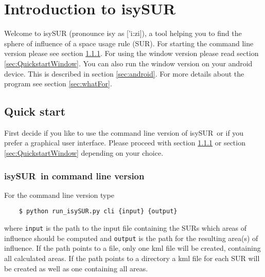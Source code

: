 \documentclass[11pt,fleqn]{book} %
\newcommand{\ProjectTitle}{isySUR}
\newcommand{\pt}{\ProjectTitle}
\begin{document}

\pagestyle{empty} %

\setcounter{tocdepth}{3}
\tableofcontents %

\cleardoublepage %

\pagestyle{fancy} %


\chapter{Introduction to \ProjectTitle}
Welcome to isySUR (pronounce isy as ['i:zi]), a tool helping you to find the sphere of influence of a space usage rule (SUR). For starting the command line version please see section \ref{sec:QuickstartTerminal}. For using the window version please read section \ref{sec:QuickstartWindow}. You can also run the window version on your android device. This is described in section \ref{sec:android}. For more details about the program see section \ref{sec:whatFor}.

\section{Quick start}
First decide if you like to use the command line version of \pt\ or if you prefer a graphical user interface. Please proceed with section \ref{sec:QuickstartTerminal} or section \ref{sec:QuickstartWindow} depending on your choice.

\subsection{\ProjectTitle\ in command line version}\label{sec:QuickstartTerminal}
For the command line version type
\begin{verbatim}
	$ python run_isySUR.py cli {input} {output}
\end{verbatim}
where \texttt{input} is the path to the input file containing the SURs which areas of influence should be computed and \texttt{output} is the path for the resulting area(s) of influence. If the path points to a file, only one kml file will be created, containing all calculated areas. If the path points to a directory a kml file for each SUR will be created as well as one containing all areas.
\end{document}
